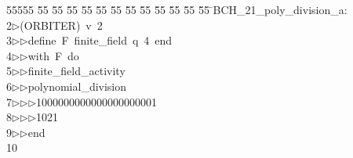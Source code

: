 %
%
\begin{tabbing}
55555 \= 55 \= 55 \= 55 \= 55 \= 55 \= 55 \= 55 \= 55 \= 55 \= 55 \= 55 \= 55 \= \>BCH\_21\_poly\_division\_a:\\[0pt]
2\>$\triangleright$\>(ORBITER)\ v\ 2\ \\[0pt]
3\>$\triangleright$\>$\triangleright$\>define\ F\ finite\_field\ q\ 4\ end\ \\[0pt]
4\>$\triangleright$\>$\triangleright$\>with\ F\ do\ \\[0pt]
5\>$\triangleright$\>$\triangleright$\>finite\_field\_activity\ \\[0pt]
6\>$\triangleright$\>$\triangleright$\>polynomial\_division\ \\[0pt]
7\>$\triangleright$\>$\triangleright$\>$\triangleright$\>1000000000000000000001\ \\[0pt]
8\>$\triangleright$\>$\triangleright$\>$\triangleright$\>1021\ \\[0pt]
9\>$\triangleright$\>$\triangleright$\>end\\[0pt]
10\>\end{tabbing}

